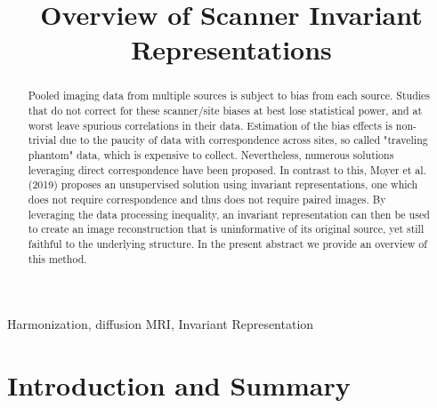 \documentclass{midl} %
\title[Overview of Scanner Invariant Representations]{Overview of Scanner Invariant Representations}
\begin{document}
\maketitle

\begin{abstract}
Pooled imaging data from multiple sources is subject to bias from each source. Studies that do not correct for these scanner/site biases at best lose statistical power, and at worst leave spurious correlations in their data. Estimation of the bias effects is non-trivial due to the paucity of data with correspondence across sites, so called "traveling phantom" data, which is expensive to collect. Nevertheless, numerous solutions leveraging direct correspondence have been proposed. In contrast to this, Moyer et al. (2019) proposes an unsupervised solution using invariant representations, one which does not require correspondence and thus does not require paired images. By leveraging the data processing inequality, an invariant representation can then be used to create an image reconstruction that is uninformative of its original source, yet still faithful to the underlying structure. In the present abstract we provide an overview of this method.
\end{abstract}

\begin{keywords}
Harmonization, diffusion MRI, Invariant Representation
\end{keywords}

\section{Introduction and Summary}
\end{document}
